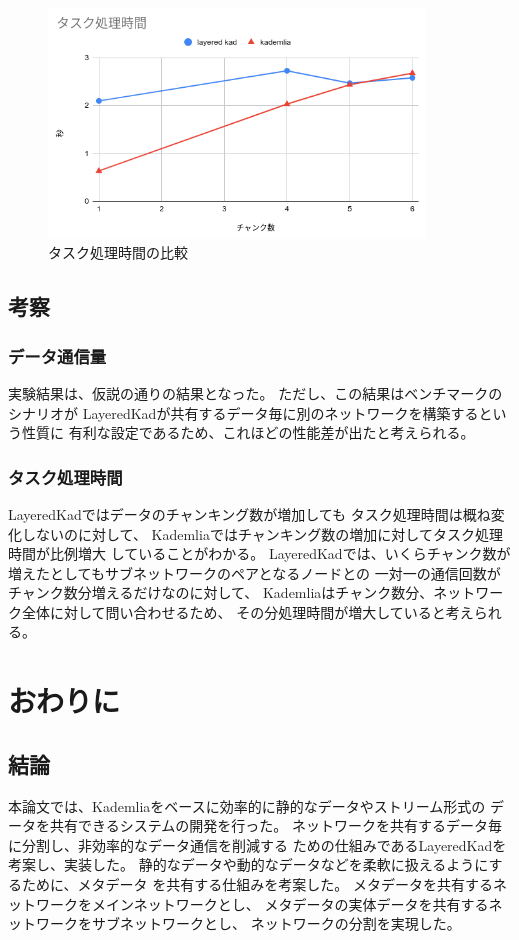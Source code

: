 \documentclass[sotsuron]{jcsie}
\begin{document}
\begin{figure}[H]
	\centering
	\includegraphics[width=10cm]{./assets/image/calc_compare.png}
	\caption{タスク処理時間の比較}
	\label{fig:calc_compare.png}
\end{figure}

\section{考察}
\subsection{データ通信量}
実験結果は、仮説の通りの結果となった。
ただし、この結果はベンチマークのシナリオが
LayeredKadが共有するデータ毎に別のネットワークを構築するという性質に
有利な設定であるため、これほどの性能差が出たと考えられる。

\subsection{タスク処理時間}
LayeredKadではデータのチャンキング数が増加しても
タスク処理時間は概ね変化しないのに対して、
Kademliaではチャンキング数の増加に対してタスク処理時間が比例増大
していることがわかる。
LayeredKadでは、いくらチャンク数が増えたとしてもサブネットワークのペアとなるノードとの
一対一の通信回数がチャンク数分増えるだけなのに対して、
Kademliaはチャンク数分、ネットワーク全体に対して問い合わせるため、
その分処理時間が増大していると考えられる。


\chapter{おわりに}
\section{結論}
本論文では、Kademliaをベースに効率的に静的なデータやストリーム形式の
データを共有できるシステムの開発を行った。
ネットワークを共有するデータ毎に分割し、非効率的なデータ通信を削減する
ための仕組みであるLayeredKadを考案し、実装した。
静的なデータや動的なデータなどを柔軟に扱えるようにするために、メタデータ
を共有する仕組みを考案した。
メタデータを共有するネットワークをメインネットワークとし、
メタデータの実体データを共有するネットワークをサブネットワークとし、
ネットワークの分割を実現した。
\end{document}
